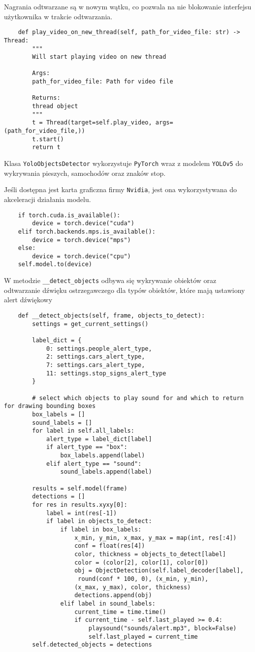 Nagrania odtwarzane są w nowym wątku, co pozwala na nie blokowanie interfejsu użytkownika w trakcie odtwarzania.

\begin{verbatim}
	def play_video_on_new_thread(self, path_for_video_file: str) -> Thread:
		"""
		Will start playing video on new thread
		
		Args:
		path_for_video_file: Path for video file
		
		Returns:
		thread object
		"""
		t = Thread(target=self.play_video, args=(path_for_video_file,))
		t.start()
		return t
\end{verbatim}


Klasa \verb|YoloObjectsDetector| wykorzystuje \verb|PyTorch| wraz z  modelem \verb|YOLOv5| do wykrywania pieszych, samochodów oraz znaków stop.

Jeśli dostępna jest karta graficzna firmy \verb|Nvidia|, jest ona wykorzystywana do akceleracji działania modelu.

\begin{verbatim}
	if torch.cuda.is_available():
		device = torch.device("cuda")
	elif torch.backends.mps.is_available():
		device = torch.device("mps")
	else:
		device = torch.device("cpu")
	self.model.to(device)
\end{verbatim}

W metodzie \verb|__detect_objects| odbywa się wykrywanie obiektów oraz odtwarzanie dźwięku ostrzegawczego dla typów obiektów, które mają ustawiony alert dźwiękowy

\begin{verbatim}
	def __detect_objects(self, frame, objects_to_detect):
		settings = get_current_settings()
		
		label_dict = {
			0: settings.people_alert_type,
			2: settings.cars_alert_type,
			7: settings.cars_alert_type,
			11: settings.stop_signs_alert_type
		}
		
		# select which objects to play sound for and which to return for drawing bounding boxes
		box_labels = []
		sound_labels = []
		for label in self.all_labels:
			alert_type = label_dict[label]
			if alert_type == "box":
				box_labels.append(label)
			elif alert_type == "sound":
				sound_labels.append(label)
		
		results = self.model(frame)
		detections = []
		for res in results.xyxy[0]:
			label = int(res[-1])
			if label in objects_to_detect:
				if label in box_labels:
					x_min, y_min, x_max, y_max = map(int, res[:4])
					conf = float(res[4])
					color, thickness = objects_to_detect[label]
					color = (color[2], color[1], color[0])
					obj = ObjectDetection(self.label_decoder[label],
					 round(conf * 100, 0), (x_min, y_min),
					(x_max, y_max), color, thickness)
					detections.append(obj)
				elif label in sound_labels:
					current_time = time.time()
					if current_time - self.last_played >= 0.4:
						playsound("sounds/alert.mp3", block=False)
						self.last_played = current_time
		self.detected_objects = detections
\end{verbatim}

